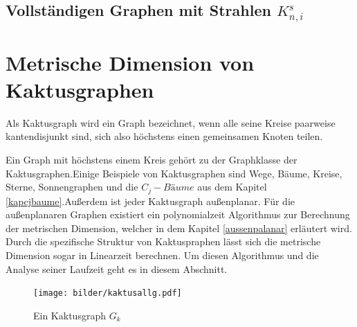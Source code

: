 \section{Vollständigen Graphen mit Strahlen $K^s_{n,i}$}
\vspace{-2mm}
\chapter{Metrische Dimension von Kaktusgraphen}
\label{kapkaktus}
\begin{defi}
Als Kaktusgraph wird ein Graph bezeichnet, wenn alle seine Kreise paarweise kantendisjunkt sind, sich also höchstens einen gemeinsamen Knoten teilen.
\end{defi}
Ein Graph mit höchstens einem Kreis gehört zu der Graphklasse der Kaktusgraphen.\newline Einige Beispiele von Kaktusgraphen sind Wege, Bäume, Kreise, Sterne, Sonnengraphen und die $C_j-Bäume$ aus dem Kapitel \ref{kapcjbaume}.\newline Außerdem ist jeder Kaktusgraph außenplanar. Für die außenplanaren Graphen existiert ein polynomialzeit Algorithmus zur Berechnung der metrischen Dimension, welcher in dem Kapitel \ref{aussenpalanar} erläutert wird. Durch die spezifische Struktur von Kaktuspraphen lässt sich die metrische Dimension sogar in Linearzeit berechnen. Um diesen Algorithmus und die Analyse seiner Laufzeit geht es in diesem Abschnitt.
\begin{figure}[h!]
		\centering
 		 \texttt{[image: bilder/kaktusallg.pdf]}
   \caption{Ein Kaktusgraph $G_k$}
   \label{gk}
  	 \end{figure}
  	 \vspace{-2mm}
